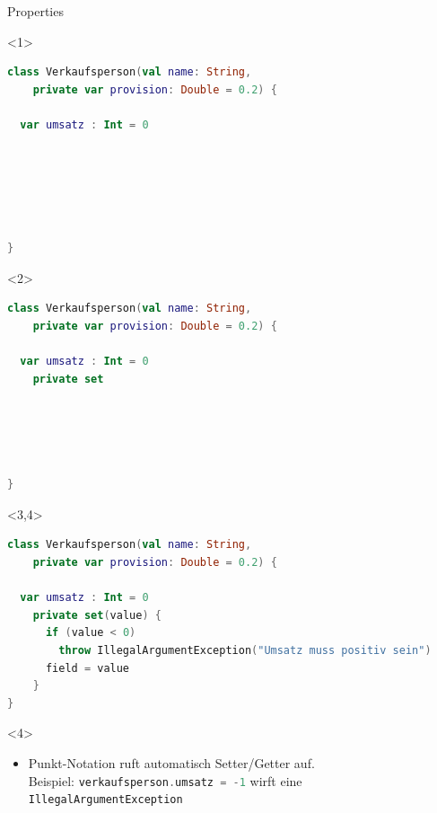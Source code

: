 \documentclass{beamer}
\begin{document}
\begin{frame}[fragile]{Properties}
  \begin{onlyenv}<1>
    \begin{lstlisting}[language=Kotlin, title=Kotlin: Properties, xleftmargin=1em]
class Verkaufsperson(val name: String, 
    private var provision: Double = 0.2) {
            
  var umsatz : Int = 0



      
      
      
}
    \end{lstlisting}
  \end{onlyenv}
  \begin{onlyenv}<2>
    \begin{lstlisting}[language=Kotlin, title=Kotlin: Properties Zugriffsmodifikator, xleftmargin=1em]
class Verkaufsperson(val name: String, 
    private var provision: Double = 0.2) {
      
  var umsatz : Int = 0
    private set





}
    \end{lstlisting}
  \end{onlyenv}
  \begin{onlyenv}<3,4>
    \begin{lstlisting}[language=Kotlin, title=Kotlin: Benutzerdefinierte Zugriffsmethoden, xleftmargin=1em]
class Verkaufsperson(val name: String, 
    private var provision: Double = 0.2) {

  var umsatz : Int = 0
    private set(value) {
      if (value < 0)
        throw IllegalArgumentException("Umsatz muss positiv sein")
      field = value
    }
}
    \end{lstlisting}
  \end{onlyenv}
  \begin{uncoverenv}<4>
    \begin{itemize}
    \item Punkt-Notation ruft automatisch Setter/Getter auf. \\
    \hspace{0.25cm} Beispiel: \lstinline[language=kotlin]|verkaufsperson.umsatz = -1| wirft eine \\
    \hspace{0.25cm} \texttt{IllegalArgumentException}
    \end{itemize}
  \end{uncoverenv}
\end{frame}
\end{document}
